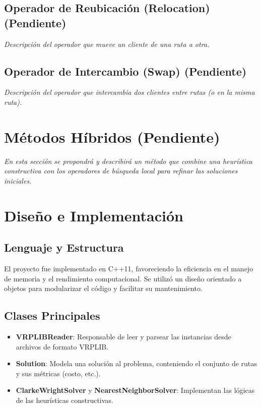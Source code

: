 \documentclass[a4paper,12pt]{article}
\begin{document}
\subsection{Operador de Reubicación (Relocation) (Pendiente)}
\textit{Descripción del operador que mueve un cliente de una ruta a otra.}

\subsection{Operador de Intercambio (Swap) (Pendiente)}
\textit{Descripción del operador que intercambia dos clientes entre rutas (o en la misma ruta).}

\section{Métodos Híbridos (Pendiente)}
\textit{En esta sección se propondrá y describirá un método que combine una heurística constructiva con los operadores de búsqueda local para refinar las soluciones iniciales.}

\section{Diseño e Implementación}

\subsection{Lenguaje y Estructura}
El proyecto fue implementado en C++11, favoreciendo la eficiencia en el manejo de memoria y el rendimiento computacional. Se utilizó un diseño orientado a objetos para modularizar el código y facilitar su mantenimiento.

\subsection{Clases Principales}
\begin{itemize}
    \item \textbf{VRPLIBReader}: Responsable de leer y parsear las instancias desde archivos de formato VRPLIB.
    \item \textbf{Solution}: Modela una solución al problema, conteniendo el conjunto de rutas y sus métricas (costo, etc.).
    \item \textbf{ClarkeWrightSolver} y \textbf{NearestNeighborSolver}: Implementan las lógicas de las heurísticas constructivas.
\end{itemize}
\end{document}
